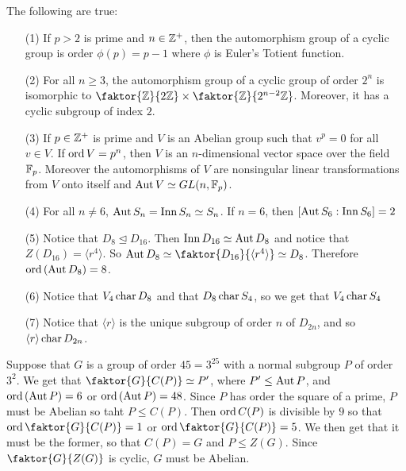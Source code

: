 \begin{theorem}\label{4.4.6}
    The following are true:
    \begin{enumerate}
        \item[(1)] If $p>2$ is prime and $n \in \mathbb{Z}^+$, then the automorphism
            group of a cyclic group is order $\phi(p)=p-1$ where $\phi$ is
            Euler's Totient function.

        \item[(2)] For all $n \geq 3$, the automorphism group of a cyclic group
            of order  $2^n$ is isomorphic to  $\faktor{\Z}{2\Z} \times
            \faktor{\Z}{2^{n-2}\Z}$. Moreover, it has a cyclic subgroup of index
            $2$.

        \item[(3)] If $p \in \mathbb{Z}^+$ is prime and $V$ is an Abelian group such
            that  $v^p=0$ for all $v \in V$. If  $\operatorname{ord}{V}=p^n$, then $V$ is an
            $n$-dimensional vector space over the field  $\mathbb{F}_p$. Moreover the
            automorphisms of $V$ are nonsingular linear transformations from $V$
            onto itself and  $\operatorname{Aut}{V} \simeq GL(n,\mathbb{F}_p)$.

        \item[(4)] For all $n \neq 6$,  $\operatorname{Aut}{S_n}=\operatorname{Inn}{S_n} \simeq S_n$. If
            $n=6$, then $[\operatorname{Aut}{S_6}:\operatorname{Inn}{S_6}]=2$

        \item[(5)] Notice that $D_8 \unlhd D_{16}$. Then $\operatorname{Inn}{D_{16}} \simeq
            \operatorname{Aut}{D_8}$ and notice that $Z(D_{16})= \langle r^4 \rangle$. So
            $\Aut{D_8} \simeq \faktor{D_{16}}{\langle r^4 \rangle} \simeq D_8$.
            Therefore $\operatorname{ord}{{(\operatorname{Aut}{D_8})}}=8$.

        \item[(6)] Notice that $V_4 \operatorname{char} D_8$ and that $D_8 \operatorname{char} S_4$, so we
            get that $V_4 \operatorname{char} S_4$

        \item[(7)] Notice that $\langle r \rangle$ is the unique subgroup of
            order $n$ of  $D_{2n}$, and so $\langle r \rangle \operatorname{char} D_{2n}$.
    \end{enumerate}
\end{theorem}

\begin{example}\label{}
    Suppose that $G$ is a group of order  $45=3^25$ with a normal subgroup $P$
    of order $3^2$. We get that  $\faktor{G}{C(P)} \simeq P'$, where $P' \leq
    \operatorname{Aut}{P}$, and $\operatorname{ord}{(\operatorname{Aut}{P})}=6$ or $\operatorname{ord}{(\operatorname{Aut}{P})}=48$. Since $P$ has
    order the square of a prime,  $P$ must be Abelian so taht  $P \leq C(P)$.
    Then $\operatorname{ord}{C(P)}$ is divisible by $9$ so that $\ord {\faktor{G}{C(P)}}=1$ or
    $\ord{\faktor{G}{C(P)}}=5$. We then get that it must be the former, so that
    $C(P)=G$ and $P \leq Z(G)$. Since $\faktor{G}{Z(G)}$ is cyclic, $G$ must be
    Abelian.
\end{example}

